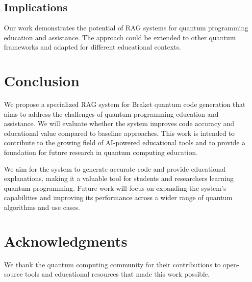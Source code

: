 \documentclass[runningheads]{llncs}
\begin{document}
\subsection{Implications}
Our work demonstrates the potential of RAG systems for quantum programming education and assistance. The approach could be extended to other quantum frameworks and adapted for different educational contexts.

\section{Conclusion}

We propose a specialized RAG system for Braket quantum code generation that aims to address the challenges of quantum programming education and assistance. We will evaluate whether the system improves code accuracy and educational value compared to baseline approaches. This work is intended to contribute to the growing field of AI-powered educational tools and to provide a foundation for future research in quantum computing education.

We aim for the system to generate accurate code and provide educational explanations, making it a valuable tool for students and researchers learning quantum programming. Future work will focus on expanding the system's capabilities and improving its performance across a wider range of quantum algorithms and use cases.

\section*{Acknowledgments}
We thank the quantum computing community for their contributions to open-source tools and educational resources that made this work possible.


\newpage

\end{document}

